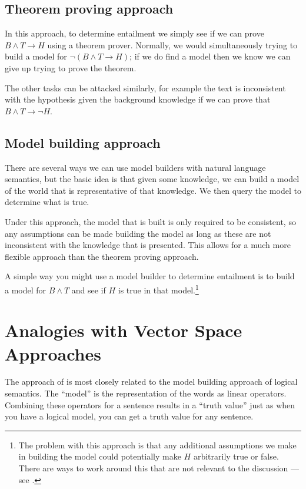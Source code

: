 \documentclass{article}
\begin{document}
\subsection*{Theorem proving approach}

In this approach, to determine entailment we simply see if we can
prove $B\land T \rightarrow H$ using a theorem prover. Normally, we
would simultaneously trying to build a model for $\lnot(B\land T
\rightarrow H)$; if we do find a model then we know we can give up
trying to prove the theorem.

The other tasks can be attacked similarly, for example the text is
inconsistent with the hypothesis given the background knowledge if we
can prove that $B\land T \rightarrow \lnot H$.

\subsection*{Model building approach}

There are several ways we can use model builders with natural language
semantics, but the basic idea is that given some knowledge, we can
build a model of the world that is representative of that
knowledge. We then query the model to determine what is true.

Under this approach, the model that is built is only required to be
consistent, so any assumptions can be made building the model as long
as these are not inconsistent with the knowledge that is
presented. This allows for a much more flexible approach than the
theorem proving approach.

A simple way you might use a model builder to determine entailment is
to build a model for $B\land T$ and see if $H$ is true in that
model.\footnote{The problem with this approach is that any additional
assumptions we make in building the model could potentially make $H$
arbitrarily true or false. There are ways to work around this that are
not relevant to the discussion --- see \cite{Bos:06}.}

\section{Analogies with Vector Space Approaches}

The approach of \cite{Clark:08} is most closely related to the model
building approach of logical semantics. The ``model'' is the
representation of the words as linear operators. Combining these
operators for a sentence results in a ``truth value'' just as when you
have a logical model, you can get a truth value for any sentence.
\end{document}
